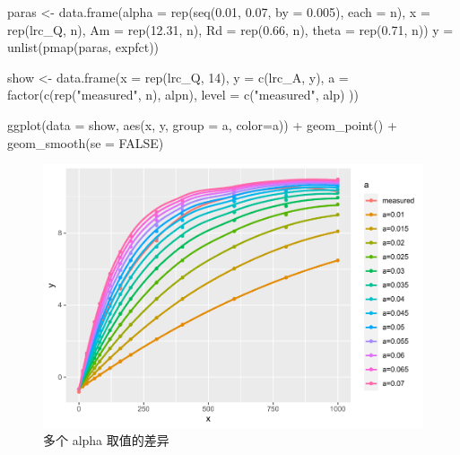 \documentclass[
]{krantz}
\makeatletter
\newenvironment{Shaded}{\begin{snugshade}}{\end{snugshade}}
\newcommand{\AttributeTok}[1]{\textcolor[rgb]{0.77,0.63,0.00}{#1}}
\newcommand{\ConstantTok}[1]{\textcolor[rgb]{0.00,0.00,0.00}{#1}}
\newcommand{\DecValTok}[1]{\textcolor[rgb]{0.00,0.00,0.81}{#1}}
\newcommand{\FloatTok}[1]{\textcolor[rgb]{0.00,0.00,0.81}{#1}}
\newcommand{\FunctionTok}[1]{\textcolor[rgb]{0.00,0.00,0.00}{#1}}
\newcommand{\NormalTok}[1]{#1}
\newcommand{\OtherTok}[1]{\textcolor[rgb]{0.56,0.35,0.01}{#1}}
\newcommand{\SpecialCharTok}[1]{\textcolor[rgb]{0.00,0.00,0.00}{#1}}
\newcommand{\StringTok}[1]{\textcolor[rgb]{0.31,0.60,0.02}{#1}}
\newenvironment{kframe}{%
\medskip{}
\setlength{\fboxsep}{.8em}
 \def\at@end@of@kframe{}%
 \ifinner\ifhmode%
  \def\at@end@of@kframe{\end{minipage}}%
  \begin{minipage}{\columnwidth}%
 \fi\fi%
 \def\FrameCommand##1{\hskip\@totalleftmargin \hskip-\fboxsep
 \colorbox{shadecolor}{##1}\hskip-\fboxsep
     \hskip-\linewidth \hskip-\@totalleftmargin \hskip\columnwidth}%
 \MakeFramed {\advance\hsize-\width
   \@totalleftmargin\z@ \linewidth\hsize
   \@setminipage}}%
 {\par\unskip\endMakeFramed%
 \at@end@of@kframe}
\renewenvironment{Shaded}{\begin{kframe}}{\end{kframe}}
\makeatother
\begin{document}
\begin{Shaded}
\begin{Highlighting}[]
\NormalTok{paras }\OtherTok{\textless{}{-}} \FunctionTok{data.frame}\NormalTok{(}\AttributeTok{alpha =} \FunctionTok{rep}\NormalTok{(}\FunctionTok{seq}\NormalTok{(}\FloatTok{0.01}\NormalTok{, }\FloatTok{0.07}\NormalTok{, }\AttributeTok{by =} \FloatTok{0.005}\NormalTok{), }\AttributeTok{each =}\NormalTok{ n), }
           \AttributeTok{x =} \FunctionTok{rep}\NormalTok{(lrc\_Q, n), }\AttributeTok{Am =} \FunctionTok{rep}\NormalTok{(}\FloatTok{12.31}\NormalTok{, n), }\AttributeTok{Rd =} \FunctionTok{rep}\NormalTok{(}\FloatTok{0.66}\NormalTok{, n), }
           \AttributeTok{theta =} \FunctionTok{rep}\NormalTok{(}\FloatTok{0.71}\NormalTok{, n))}
\NormalTok{y }\OtherTok{=} \FunctionTok{unlist}\NormalTok{(}\FunctionTok{pmap}\NormalTok{(paras, expfct))}

\NormalTok{show }\OtherTok{\textless{}{-}} \FunctionTok{data.frame}\NormalTok{(}\AttributeTok{x =} \FunctionTok{rep}\NormalTok{(lrc\_Q, }\DecValTok{14}\NormalTok{),}
           \AttributeTok{y =} \FunctionTok{c}\NormalTok{(lrc\_A, y), }
           \AttributeTok{a =} \FunctionTok{factor}\NormalTok{(}\FunctionTok{c}\NormalTok{(}\FunctionTok{rep}\NormalTok{(}\StringTok{"measured"}\NormalTok{, n), alpn),}
           \AttributeTok{level =} \FunctionTok{c}\NormalTok{(}\StringTok{"measured"}\NormalTok{, alp)}
\NormalTok{             ))}

\FunctionTok{ggplot}\NormalTok{(}\AttributeTok{data =}\NormalTok{ show, }\FunctionTok{aes}\NormalTok{(x, y, }\AttributeTok{group =}\NormalTok{ a, }\AttributeTok{color=}\NormalTok{a)) }\SpecialCharTok{+} 
  \FunctionTok{geom\_point}\NormalTok{() }\SpecialCharTok{+} 
  \FunctionTok{geom\_smooth}\NormalTok{(}\AttributeTok{se =} \ConstantTok{FALSE}\NormalTok{) }
\end{Highlighting}
\end{Shaded}

\begin{figure}
\centering
\includegraphics{bookdown_files/figure-latex/malp-1.pdf}
\caption{\label{fig:malp}多个 alpha 取值的差异}
\end{figure}
\end{document}
